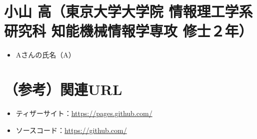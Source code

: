 \documentclass[uplatex,a4paper,12pt]{jsarticle}
\begin{document}
\section{小山 高（東京大学大学院 情報理工学系研究科 知能機械情報学専攻 修士２年）}
\begin{itemize}
  \item Aさんの氏名（A）
\end{itemize}

\section*{（参考）関連URL} %
\begin{itemize}
  \item ティザーサイト：\url{https://pages.github.com/}
  \item ソースコード：\url{https://github.com/}
\end{itemize}
\end{document}
